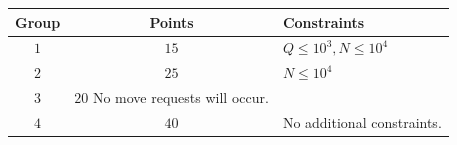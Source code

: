 
\begin{center}
\begin{tabular}{| c | c | l |}
  \hline
  \textbf{Group} & \textbf{Points} & \textbf{Constraints} \\ \hline
  $1$    & $15$  & $Q \le 10^3, N \le 10^4$ \\ \hline
  $2$    & $25$  & $N \le 10^4$ \\ \hline
  $3$    & $20$   No move requests will occur. \\ \hline
  $4$    & $40$  & No additional constraints. \\ \hline
\end{tabular}
\end{center}
